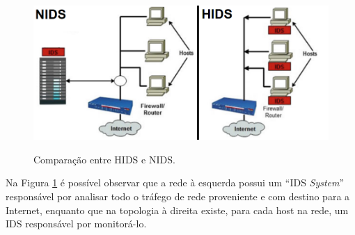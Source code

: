 \begin{figure}[H]
\centering
\caption{Comparação entre HIDS e NIDS.} \includegraphics[width=12cm,height=\textwidth,keepaspectratio]{figs/hids_nids.png}
\newline {}\label{fig:nids_hids}
\end{figure}

Na Figura \ref{fig:nids_hids} é possível observar que a rede à esquerda possui um ``IDS \textit{System}'' responsável por analisar todo o tráfego de rede proveniente e com destino para a Internet, enquanto que na topologia à direita existe, para cada host na rede, um IDS responsável por monitorá-lo.

